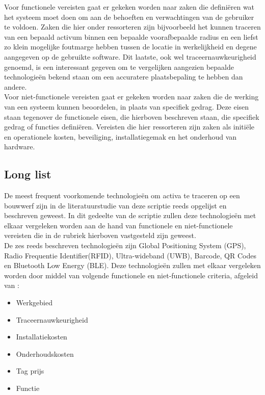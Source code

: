 Voor functionele vereisten gaat er gekeken worden naar zaken die definiëren wat het systeem moet doen om aan de behoeften en verwachtingen van de gebruiker te voldoen. Zaken die hier onder ressorteren zijn bijvoorbeeld het kunnen traceren van een bepaald activum binnen een bepaalde voorafbepaalde radius en een liefst zo klein mogelijke foutmarge hebben tussen de locatie in werkelijkheid en degene aangegeven op de gebruikte software. Dit laatste, ook wel traceernauwkeurigheid genoemd, is een interessant gegeven om te vergelijken aangezien bepaalde technologieën bekend staan om een accuratere plaatsbepaling te hebben dan andere.\\

Voor niet-functionele vereisten gaat er gekeken worden naar zaken die de werking van een systeem kunnen beoordelen, in plaats van specifiek gedrag. Deze eisen staan tegenover de functionele eisen, die hierboven beschreven staan, die specifiek gedrag of functies definiëren. Vereisten die hier ressorteren zijn zaken als initiële en operationele kosten, beveiliging, installatiegemak en het onderhoud van hardware.

\subsection{Long list}
De meest frequent voorkomende technologieën om activa te traceren op een bouwwerf zijn in de literatuurstudie van deze scriptie reeds opgelijst en beschreven geweest. In dit gedeelte van de scriptie zullen deze technologieën met elkaar vergeleken worden aan de hand van functionele en niet-functionele vereisten die in de rubriek hierboven vastgesteld zijn geweest.\\

De zes reeds beschreven technologieën zijn Global Positioning System (GPS), Radio Frequentie Identifier(RFID), Ultra-wideband (UWB), Barcode, QR Codes en Bluetooth Low Energy (BLE). Deze technologieën zullen met elkaar vergeleken worden door middel van volgende functionele en niet-functionele criteria, afgeleid van \textcite{Ahmed2020}:

\begin{itemize}
    \item Werkgebied
    \item Traceernauwkeurigheid
    \item Installatiekosten
    \item Onderhoudskosten
    \item Tag prijs
    \item Functie
\end{itemize}


